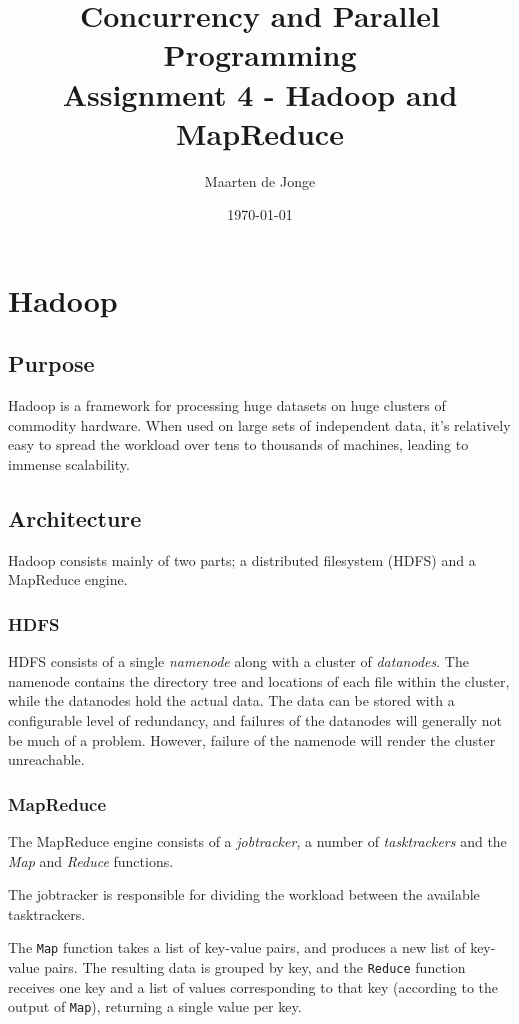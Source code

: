 \documentclass[a4paper]{article}
\author{Maarten de Jonge}
\date{\today}
\title{Concurrency and Parallel Programming \\
       \large{Assignment 4 - Hadoop and MapReduce}}
\begin{document}
\maketitle

\section*{Hadoop}

\subsection*{Purpose}
Hadoop is a framework for processing huge datasets on huge clusters of
commodity hardware. When used on large sets of independent data, it's relatively
easy to spread the workload over tens to thousands of machines, leading to
immense scalability.

\subsection*{Architecture}
Hadoop consists mainly of two parts; a distributed filesystem (HDFS) and a MapReduce
engine.

\subsubsection*{HDFS}
HDFS consists of a single \emph{namenode} along with a cluster of
\emph{datanodes}. The namenode contains the directory tree and locations of each
file within the cluster, while the datanodes hold the actual data. The data can
be stored with a configurable level of redundancy, and failures of the datanodes
will generally not be much of a problem. However, failure of the namenode will
render the cluster unreachable.

\subsubsection*{MapReduce}
The MapReduce engine consists of a \emph{jobtracker}, a number of
\emph{tasktrackers} and the \emph{Map} and \emph{Reduce} functions.

The jobtracker is responsible for dividing the workload between the available
tasktrackers.

The \texttt{Map} function takes a list of key-value pairs, and produces a new
list of key-value pairs. The resulting data is grouped by key, and the
\texttt{Reduce} function receives one key and a list of values corresponding to
that key (according to the output of \texttt{Map}), returning a single value per
key.
\end{document}
